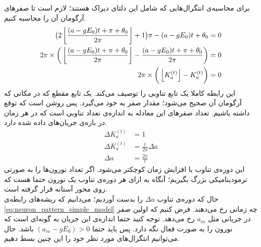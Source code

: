 برای محاسبه‌ی انتگرال‌هایی که شامل این دلتای دیراک هستند؛ لازم است تا صفر‌های آرگومان آن را محاسبه کنیم.
\begin{align}
	\big( 2 \left\lfloor \frac{(a - gE_0)t + \pi + \theta_0}{2\pi} \right\rfloor + 1 \big)\pi - (a - g E_0)t + \theta_0 &= 0\\
	2\pi \times \bigg( \left\lfloor \frac{(a - gE_0)t + \pi + \theta_0}{2\pi} \right\rfloor  - \frac{(a - gE_0)t + \pi + \theta_0}{2\pi} \bigg) &= 0\\
	2\pi \times \bigg( \left\lfloor K^{(t)}_a \right\rfloor - K^{(t)}_a \bigg) &= 0  \label{eq:neuron_pattern_simple_model}
\end{align}
این رابطه کاملا یک تابع تناوبی را توصیف می‌کند. یک تابع مقطع که در مکانی که آرگومان آن صحیح می‌شود؛ مقدار صفر به خود می‌گیرد. پس روشن است که توقع داشته باشیم. تعداد صفرهای این معادله به اندازه‌ی تعداد تناوبی است که در هر زمان در بازه‌ی جریان‌های داده شده دارد.
\begin{align}
	\Delta K^{(t)}_a  &= 1\\
	\Delta K^{(t)}_a &= \frac{t}{2\pi}\Delta a\\
	\Delta a &= \frac{2\pi}{t}
\end{align}
این دوره‌ی تناوب با افزایش زمان کوچکتر می‌شود. اگر تعداد نورون‌ها را به صورتی ترمودینامیکی بزرگ بگیریم؛ آنگاه به ازای هر دوره‌ی تناوب یک نورون حتما هست که روی محور آستانه قرار گرفته است.\\
حال که دوره‌ی تناوب 
$\Delta a$
را بدست آوردیم؛ می‌دانیم که ریشه‌های رابطه‌ی 
\ref{eq:neuron_pattern_simple_model}
چه زمانی رخ می‌دهند. فرض کنیم که اولین صفر در جریانی مثل
$a_m$
رخ می‌دهد. توجه کنید حتما اندازه‌ی این جریان به گونه‌ای است که نورون را به صورت فعال نگه دارد. پس باید حتما
$(a_m - g E_0) > 0 $
باشد.
حال می‌توانیم انتگرال‌های مورد نظر خود را این چنین بسط دهیم.

